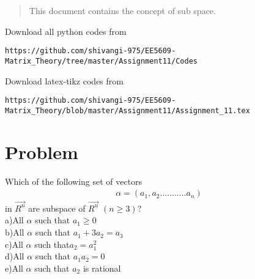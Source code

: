 \documentclass[journal,12pt,twocolumn]{IEEEtran}
\begin{document}
%
\vspace{2ex}
\begin{center}
\end{center}
\begin{abstract}
This document contains the concept of sub space.
\end{abstract}
Download all python codes from 
%
\begin{lstlisting}
https://github.com/shivangi-975/EE5609-Matrix_Theory/tree/master/Assignment11/Codes
\end{lstlisting}
%
Download latex-tikz codes from 
%
\begin{lstlisting}
https://github.com/shivangi-975/EE5609-Matrix_Theory/blob/master/Assignment11/Assignment_11.tex
\end{lstlisting}
%
\section{Problem}
Which of the following set of vectors
\begin{align}\alpha=(a_1,a_2...........a_n)\nonumber\end{align} in $\vec{R^n}$ are subspace of $\vec{R^n}$ $(n\geq3)$?\\
a)All $\alpha$ such that $a_1\geq0$\\
b)All $\alpha$ such that $a_1+3a_2=a_3$\\
c)All $\alpha$ such that$a_2=a_1^{2}$\\
d)All $\alpha$ such that $a_1a_2=0$\\
e)All $\alpha$ such that $a_2$ is rational
%
%	
\end{document}
